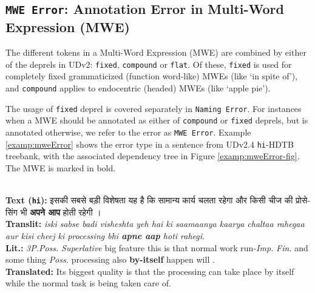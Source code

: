 \subsection[Annotation Error in Multi-Word Expression (MWE): \texttt{MWE Error}]{\texttt{MWE Error}: Annotation Error in Multi-Word Expression (MWE)}

The different tokens in a Multi-Word Expression (MWE) are combined by either of the deprels in UDv2: \texttt{fixed}, \texttt{compound} or \texttt{flat}. Of these, \texttt{fixed} is used for completely fixed grammaticized (function word-like) MWEs (like `in spite of'), and \texttt{compound} applies to endocentric (headed) MWEs (like `apple pie').

The usage of \texttt{fixed} deprel is covered separately in \texttt{Naming Error}. For instances when a MWE should be annotated as either of \texttt{compound} or \texttt{fixed} deprels, but is annotated otherwise, we refer to the error as \texttt{MWE Error}. Example \ref{examp:mweError} shows the error type in a sentence from UDv2.4 \texttt{hi}-HDTB treebank, with the associated dependency tree in Figure \ref{examp:mweError-fig}. The MWE is marked in bold.

\newpage
\begin{example}
\label{examp:mweError}
\textbf{ }\\
\textbf{Text (\texttt{hi}):} \texthindi{इसकी सबसे बड़ी विशेषता यह है कि सामान्य कार्य चलता रहेगा और किसी चीज की प्रोसेसिंग भी \textbf{अपने आप} होती रहेगी ।}\\
\textbf{Translit:} \textit{iski sabse badi visheshta yeh hai ki saamaanya kaarya chaltaa rahegaa aur kisi cheej ki processing bhi \textbf{apne aap} hoti rahegi.}\\
\textbf{Lit.:} \textit{3P.Poss.} \textit{Superlative} big feature this is that normal work run-\textit{Imp.} \textit{Fin.} and some thing \textit{Poss.} processing also \textbf{by-itself} happen will .\\
\textbf{Translated:} Its biggest quality is that the processing can take place by itself while the normal task is being taken care of.
\end{example}

